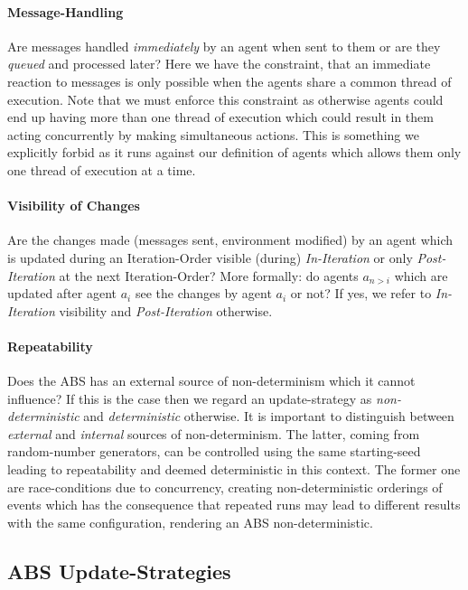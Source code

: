 \paragraph{Message-Handling}
Are messages handled \textit{immediately} by an agent when sent to them or are they \textit{queued} and processed later? Here we have the constraint, that an immediate reaction to messages is only possible when the agents share a common thread of execution. Note that we must enforce this constraint as otherwise agents could end up having more than one thread of execution which could result in them acting concurrently by making simultaneous actions. This is something we explicitly forbid as it runs against our definition of agents which allows them only one thread of execution at a time.

\paragraph{Visibility of Changes}
Are the changes made (messages sent, environment modified) by an agent which is updated during an Iteration-Order visible (during) \textit{In-Iteration} or only \textit{Post-Iteration} at the next Iteration-Order? More formally: do agents $a_{n>i}$ which are updated after agent $a_i$ see the changes by agent $a_i$ or not? If yes, we refer to \textit{In-Iteration} visibility and \textit{Post-Iteration} otherwise.

\paragraph{Repeatability}
Does the ABS has an external source of non-determinism which it cannot influence? If this is the case then we regard an update-strategy as \textit{non-deterministic} and \textit{deterministic} otherwise. It is important to distinguish between \textit{external} and \textit{internal} sources of non-determinism. The latter, coming from random-number generators, can be controlled using the same starting-seed leading to repeatability and deemed deterministic in this context. The former one are race-conditions due to concurrency, creating non-deterministic orderings of events which has the consequence that repeated runs may lead to different results with the same configuration, rendering an ABS non-deterministic.

\subsection{ABS Update-Strategies}

